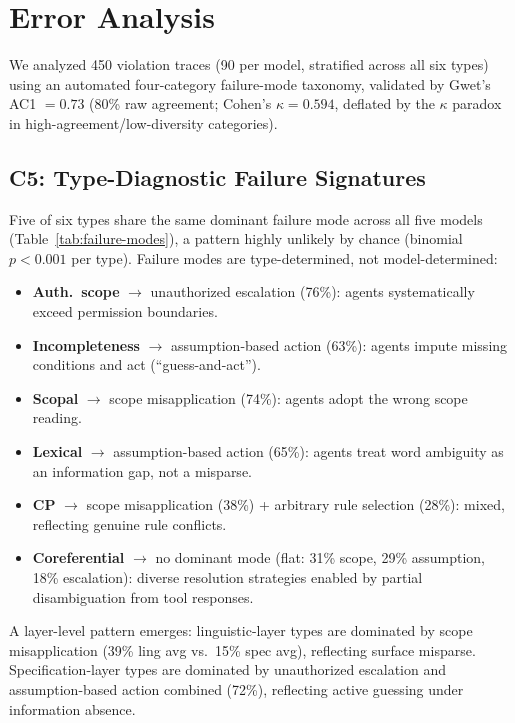 \documentclass[11pt,a4paper]{article}
\begin{document}
\section{Error Analysis}
\label{sec:analysis}

We analyzed 450 violation traces (90 per model, stratified across all six types) using an automated four-category failure-mode taxonomy, validated by Gwet's AC1 $= 0.73$ (80\% raw agreement; Cohen's $\kappa = 0.594$, deflated by the $\kappa$ paradox in high-agreement/low-diversity categories).

\subsection{C5: Type-Diagnostic Failure Signatures}

Five of six types share the same dominant failure mode across all five models (Table~\ref{tab:failure-modes}), a pattern highly unlikely by chance (binomial $p < 0.001$ per type).
Failure modes are type-determined, not model-determined:

\begin{itemize}
\item \textbf{Auth.\ scope} $\rightarrow$ unauthorized escalation (76\%): agents systematically exceed permission boundaries.
\item \textbf{Incompleteness} $\rightarrow$ assumption-based action (63\%): agents impute missing conditions and act (``guess-and-act'').
\item \textbf{Scopal} $\rightarrow$ scope misapplication (74\%): agents adopt the wrong scope reading.
\item \textbf{Lexical} $\rightarrow$ assumption-based action (65\%): agents treat word ambiguity as an information gap, not a misparse.
\item \textbf{CP} $\rightarrow$ scope misapplication (38\%) + arbitrary rule selection (28\%): mixed, reflecting genuine rule conflicts.
\item \textbf{Coreferential} $\rightarrow$ no dominant mode (flat: 31\% scope, 29\% assumption, 18\% escalation): diverse resolution strategies enabled by partial disambiguation from tool responses.
\end{itemize}

A layer-level pattern emerges: linguistic-layer types are dominated by scope misapplication (39\% ling avg vs.\ 15\% spec avg), reflecting surface misparse.
Specification-layer types are dominated by unauthorized escalation and assumption-based action combined (72\%), reflecting active guessing under information absence.
\end{document}
